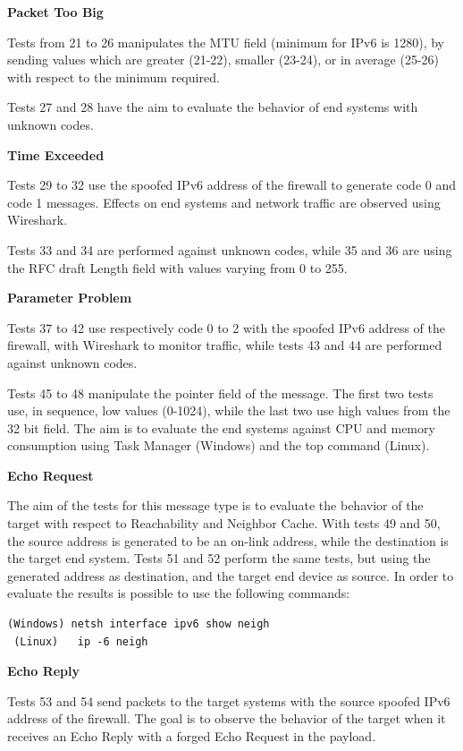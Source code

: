\documentclass[12pt]{article}
\begin{document}
\textbf{Packet Too Big}

Tests from 21 to 26 manipulates the MTU field (minimum for IPv6 is 1280), by sending values which are greater (21-22), smaller (23-24), or in average (25-26) with respect to the minimum required.

Tests 27 and 28 have the aim to evaluate the behavior of end systems with unknown codes.

\textbf{Time Exceeded}

Tests 29 to 32 use the spoofed IPv6 address of the firewall to generate code 0 and code 1 messages. Effects on end systems and network traffic are observed using Wireshark.

Tests 33 and 34 are performed against unknown codes, while 35 and 36 are using the RFC draft Length field with values varying from 0 to 255\cite{rfc4884}.

\textbf{Parameter Problem}

Tests 37 to 42 use respectively code 0 to 2 with the spoofed IPv6 address of the firewall, with Wireshark to monitor traffic, while tests 43 and 44 are performed against unknown codes.

Tests 45 to 48 manipulate the pointer field of the message. The first two tests use, in sequence, low values (0-1024), while the last two use high values from the 32 bit field. The aim is to evaluate the end systems against CPU and memory consumption using Task Manager (Windows) and the top command (Linux).

\textbf{Echo Request}

The aim of the tests for this message type is to evaluate the behavior of the target with respect to Reachability and Neighbor Cache. With tests 49 and 50, the source address is generated to be an on-link address, while the destination is the target end system. Tests 51 and 52 perform the same tests, but using the generated address as destination, and the target end device as source. In order to evaluate the results is possible to use the following commands:
\begin{lstlisting}[style=python,basicstyle=\ttfamily\small]
 (Windows) netsh interface ipv6 show neigh
 (Linux)   ip -6 neigh
\end{lstlisting}

\textbf{Echo Reply}

Tests 53 and 54 send packets to the target systems with the source spoofed IPv6 address of the firewall. The goal is to observe the behavior of the target when it receives an Echo Reply with a forged Echo Request in the payload.
\end{document}
